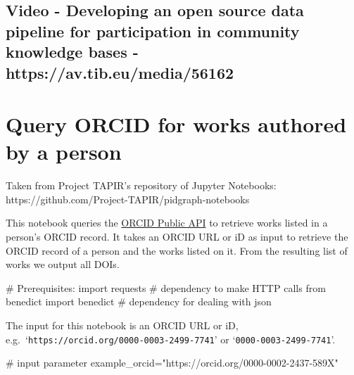 \documentclass[
  letterpaper,
  DIV=11,
  numbers=noendperiod]{scrreprt}
\newenvironment{Shaded}{\begin{snugshade}}{\end{snugshade}}
\newcommand{\CommentTok}[1]{\textcolor[rgb]{0.37,0.37,0.37}{#1}}
\newcommand{\ImportTok}[1]{\textcolor[rgb]{0.00,0.46,0.62}{#1}}
\newcommand{\NormalTok}[1]{\textcolor[rgb]{0.00,0.23,0.31}{#1}}
\newcommand{\OperatorTok}[1]{\textcolor[rgb]{0.37,0.37,0.37}{#1}}
\newcommand{\StringTok}[1]{\textcolor[rgb]{0.13,0.47,0.30}{#1}}
\begin{document}
\hypertarget{video---developing-an-open-source-data-pipeline-for-participation-in-community-knowledge-bases---httpsav.tib.eumedia56162}{%
\section{Video - Developing an open source data pipeline for
participation in community knowledge bases -
https://av.tib.eu/media/56162}\label{video---developing-an-open-source-data-pipeline-for-participation-in-community-knowledge-bases---httpsav.tib.eumedia56162}}


\hypertarget{query-orcid-for-works-authored-by-a-person}{%
\chapter{Query ORCID for works authored by a
person}\label{query-orcid-for-works-authored-by-a-person}}

Taken from Project TAPIR's repository of Jupyter Notebooks:
https://github.com/Project-TAPIR/pidgraph-notebooks

This notebook queries the \href{https://pub.orcid.org/v3.0/}{ORCID
Public API} to retrieve works listed in a person's ORCID record. It
takes an ORCID URL or iD as input to retrieve the ORCID record of a
person and the works listed on it. From the resulting list of works we
output all DOIs.

\begin{Shaded}
\begin{Highlighting}[]
\CommentTok{\# Prerequisites:}
\ImportTok{import}\NormalTok{ requests                        }\CommentTok{\# dependency to make HTTP calls}
\ImportTok{from}\NormalTok{ benedict }\ImportTok{import}\NormalTok{ benedict          }\CommentTok{\# dependency for dealing with json}
\end{Highlighting}
\end{Shaded}

The input for this notebook is an ORCID URL or iD,
e.g.~`\texttt{https://orcid.org/0000-0003-2499-7741}' or
`\texttt{0000-0003-2499-7741}'.

\begin{Shaded}
\begin{Highlighting}[]
\CommentTok{\# input parameter}
\NormalTok{example\_orcid}\OperatorTok{=}\StringTok{"https://orcid.org/0000{-}0002{-}2437{-}589X"}
\end{Highlighting}
\end{Shaded}
\end{document}

